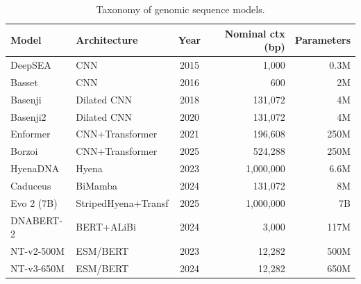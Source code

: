 \begin{table}[t]
\centering
\caption{Taxonomy of genomic sequence models.}
\label{tab:model_taxonomy}
\begin{tabular}{llcrr}
\toprule
Model & Architecture & Year & Nominal ctx (bp) & Parameters \\
\midrule
DeepSEA & CNN & 2015 & 1,000 & ~0.3M \\
Basset & CNN & 2016 & 600 & ~2M \\
Basenji & Dilated CNN & 2018 & 131,072 & ~4M \\
Basenji2 & Dilated CNN & 2020 & 131,072 & ~4M \\
Enformer & CNN+Transformer & 2021 & 196,608 & ~250M \\
Borzoi & CNN+Transformer & 2025 & 524,288 & ~250M \\
HyenaDNA & Hyena & 2023 & 1,000,000 & ~6.6M \\
Caduceus & BiMamba & 2024 & 131,072 & ~8M \\
Evo 2 (7B) & StripedHyena+Transf & 2025 & 1,000,000 & 7B \\
DNABERT-2 & BERT+ALiBi & 2024 & 3,000 & 117M \\
NT-v2-500M & ESM/BERT & 2023 & 12,282 & 500M \\
NT-v3-650M & ESM/BERT & 2024 & 12,282 & 650M \\
\bottomrule
\end{tabular}
\end{table}
